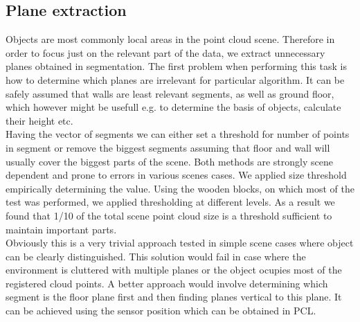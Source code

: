 \documentclass[fontsize=12pt]{article}
\begin{document}
\subsection{Plane extraction}
Objects are most commonly local areas in the point cloud scene. Therefore in order to focus just on the relevant part of the data, we extract unnecessary planes obtained in segmentation. The first problem when performing this task is how to determine which planes are irrelevant for particular algorithm. It can be safely assumed that walls are least relevant segments, as well as ground floor, which however might be usefull e.g. to determine the basis of objects, calculate their height etc.\\
\newline
\indent Having the vector of segments we can either set a threshold for number of points in segment or remove the biggest segments assuming that floor and wall will usually cover the biggest parts of the scene. Both methods are strongly scene dependent and prone to errors in various scenes cases. We applied size threshold empirically determining the value. Using the wooden blocks, on which most of the test was performed, we applied thresholding at different levels. As a result we found that 1/10 of the total scene point cloud size is a	 threshold sufficient to maintain important parts.\\
\newline
\indent Obviously this is a very trivial approach tested in simple scene cases where object can be clearly distinguished. This solution would fail in case where the environment is cluttered with multiple planes or the object ocupies most of the registered cloud points. A better approach would involve determining which segment is the floor plane first and then finding planes vertical to this plane. It can be achieved using the sensor position which can be obtained in PCL. 
\end{document}
